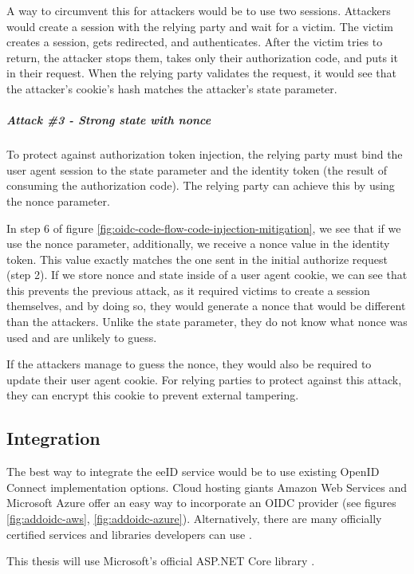 A way to circumvent this for attackers would be to use two sessions. Attackers would create a session with the relying party and wait for a victim. The victim creates a session, gets redirected, and authenticates. After the victim tries to return, the attacker stops them, takes only their authorization code, and puts it in their request. When the relying party validates the request, it would see that the attacker's cookie's hash matches the attacker's state parameter.

\subparagraph{Attack \#3 - Strong state with nonce}

To protect against authorization token injection, the relying party must bind the user agent session to the state parameter and the identity token (the result of consuming the authorization code). The relying party can achieve this by using the nonce parameter.

In step 6 of figure \ref{fig:oidc-code-flow-code-injection-mitigation}, we see that if we use the nonce parameter, additionally, we receive a nonce value in the identity token. This value exactly matches the one sent in the initial {authorize} request (step 2). If we store nonce and state inside of a user agent cookie, we can see that this prevents the previous attack, as it required victims to create a session themselves, and by doing so, they would generate a nonce that would be different than the attackers. Unlike the state parameter, they do not know what nonce was used and are unlikely to guess.

If the attackers manage to guess the nonce, they would also be required to update their user agent cookie. For {relying parties} to protect against this attack, they can encrypt this cookie to prevent external tampering.

\subsection{Integration}

The best way to integrate the eeID service would be to use existing OpenID Connect implementation options. Cloud hosting giants Amazon Web Services and Microsoft Azure offer an easy way to incorporate an OIDC provider (see figures \ref{fig:addoidc-aws}, \ref{fig:addoidc-azure}). Alternatively, there are many officially certified services and libraries developers can use \cite{oidc-certified}.

This thesis will use Microsoft's official ASP.NET Core library \cite{ms-auth-oidc-src}.

